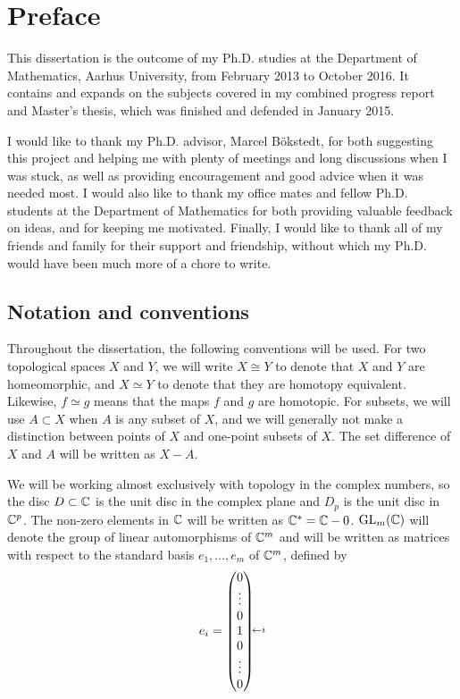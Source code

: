 \chapter{Preface} 

This dissertation is the outcome of my Ph.D. studies at the Department
of Mathematics, Aarhus University, from February 2013 to October
2016. It contains and expands on the subjects covered in my combined
progress report and Master's thesis, which was finished and defended
in January 2015.

I would like to thank my Ph.D. advisor, Marcel B\"okstedt, for both
suggesting this project and helping me with plenty of meetings and long
discussions when I was stuck, as well as providing
encouragement and good advice when it was needed most.
I would also like to thank my office mates and fellow Ph.D. students
at the Department of Mathematics
for both providing valuable feedback on ideas, and for keeping me
motivated.
Finally, I would like to thank all of my friends and family for their
support and friendship, without which my Ph.D. would have been much
more of a chore to write.

\section{Notation and conventions}

Throughout the dissertation, the following conventions will be used.
For two topological spaces $X$ and $Y$, we will write $X \cong Y$ to
denote that $X$ and $Y$ are homeomorphic, and $X\simeq Y$ to denote
that they are homotopy equivalent. Likewise, $f \simeq g$ means that
the maps $f$ and $g$ are homotopic. For subsets, we will use $A
\subset X$ when $A$ is any subset of $X$, and we will generally not
make a distinction between points of $X$ and one-point subsets of
$X$. The set difference of $X$ and $A$ will be written as $X-A$.

We will be working almost exclusively with topology in the complex
numbers,
so the disc $D\subset\mathbb{C}$ is the unit disc in the complex plane and
$D_p$ is the unit disc in $\mathbb{C}^p$. The non-zero elements in $\mathbb{C}$ will
be written as $\mathbb{C}^* = \mathbb{C} - 0$. $\operatorname{GL}_m(\mathbb{C})$ will denote the group of
linear automorphisms of $\mathbb{C}^m$ and will be written as matrices with
respect to the standard basis $e_1,\dots,e_m$ of $\mathbb{C}^m$,
defined by
\[ \xy (9,0.5)*{\scriptstyle\leftarrow i};
(0,0)*{e_i =
\begin{pmatrix}
  0 \\
  \vdots \\
  0 \\
  1 \\
  0 \\
  \vdots \\
  0
\end{pmatrix}}; \endxy
\]

